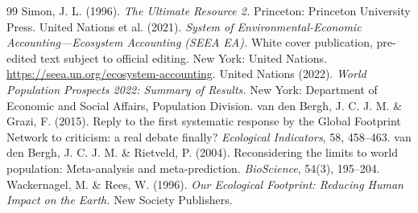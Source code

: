 \documentclass[preprint,12pt,authoryear]{elsarticle}
\begin{document}
\begin{thebibliography}{99}
 Simon, J. L. (1996). \emph{The Ultimate Resource 2.} Princeton: Princeton University Press.
 United Nations et al. (2021). \emph{System of Environmental-Economic Accounting---Ecosystem Accounting (SEEA EA).} White cover publication, pre-edited text subject to official editing. New York: United Nations. \url{https://seea.un.org/ecosystem-accounting}.
 United Nations (2022). \emph{World Population Prospects 2022: Summary of Results.} New York: Department of Economic and Social Affairs, Population Division.
 van den Bergh, J. C. J. M. \& Grazi, F. (2015). Reply to the first systematic response by the Global Footprint Network to criticism: a real debate finally? \emph{Ecological Indicators}, 58, 458--463.
 van den Bergh, J. C. J. M. \& Rietveld, P. (2004). Reconsidering the limits to world population: Meta-analysis and meta-prediction. \emph{BioScience}, 54(3), 195--204.
 Wackernagel, M. \& Rees, W. (1996). \emph{Our Ecological Footprint: Reducing Human Impact on the Earth.} New Society Publishers.
\end{thebibliography}
\end{document}
